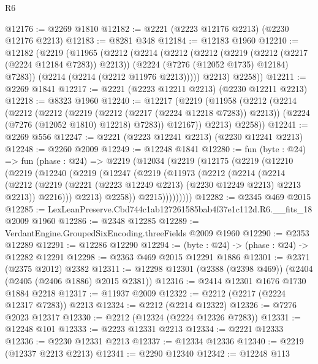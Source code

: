 \begin{lexlean}{R6}
\begin{coremodule}
@12176 := @2269 @1810
@12182 := @2221 (@2223 @12176 @2213) (@2230 @12176 @2213)
@12183 := @8281 @348
@12184 := @12183 @1960
@12210 := @12182
    (@2219
      (@11965
        (@2212
          (@2214
            (@2212
              (@2212
                (@2219 (@2212 (@2217 (@2224 @12184 @7283)) @2213))
                (@2224 (@7276 (@12052 @1735) @12184) @7283))
              (@2214 (@2214 (@2212 @11976 @2213)))))
          @2213)
        @2258))
@12211 := @2269 @1841
@12217 := @2221 (@2223 @12211 @2213) (@2230 @12211 @2213)
@12218 := @8323 @1960
@12240 := @12217
    (@2219
      (@11958
        (@2212
          (@2214
            (@2212
              (@2212
                (@2219 (@2212 (@2217 (@2224 @12218 @7283)) @2213))
                (@2224 (@7276 (@12052 @1810) @12218) @7283))
              @12167))
          @2213)
        @2258))
@12241 := @2269 @556
@12247 := @2221 (@2223 @12241 @2213) (@2230 @12241 @2213)
@12248 := @2260 @2009
@12249 := @12248 @1841
@12280 := fun (byte : @24) =>
  fun (phase : @24) =>
  @2219
    (@12034
      (@2219
        (@12175
          (@2219
            (@12210
              (@2219
                (@12240
                  (@2219
                    (@12247
                      (@2219
                        (@11973
                          (@2212
                            (@2214
                              (@2214
                                (@2212
                                  (@2219
                                    (@2221 (@2223 @12249 @2213) (@2230 @12249 @2213) @2213 @2213))
                                  @2216)))
                            @2213)
                          @2258))
                      @2215)))))))))
@12282 := @2345 @469 @2015
@12285 := LexLeanPreserve.Cbd744c1ab127261585bab4f37e1c112d.R6.__fits_18 @2009 @1960
@12286 := @2348 @12285
@12289 := VerdantEngine.GroupedSixEncoding.threeFields @2009 @1960
@12290 := @2353 @12289
@12291 := @12286 @12290
@12294 := (byte : @24) -> (phase : @24) -> @12282 @12291
@12298 := @2363 @469 @2015 @12291 @1886
@12301 := @2371 (@2375 @2012) @2382
@12311 := @12298 @12301 (@2388 (@2398 @469)) (@2404 (@2405 (@2406 @1886) @2015 @2381))
@12316 := @2414 @12301 @1676 @1730 @1884 @2218
@12317 := @11937 @2009
@12322 := @2212 (@2217 (@2224 @12317 @7283)) @2213
@12324 := @2212 (@2214 @12322)
@12326 := @7276 @2023 @12317
@12330 := @2212 (@12324 (@2224 @12326 @7283))
@12331 := @12248 @101
@12333 := @2223 @12331 @2213
@12334 := @2221 @12333
@12336 := @2230 @12331 @2213
@12337 := @12334 @12336
@12340 := @2219 (@12337 @2213 @2213)
@12341 := @2290 @12340
@12342 := @12248 @113

\end{coremodule}
\end{lexlean}
